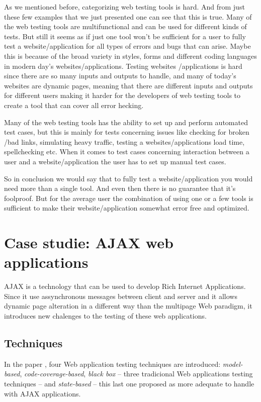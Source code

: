 \documentclass[a4paper, twocolumn]{ieee}
\begin{document}
 
As we mentioned before, categorizing web testing tools is hard. And from just these few examples that we just presented 
one can see that this is true. Many of the web testing tools are multifunctional and can be used for different kinds of 
tests. But still it seems as if just one tool won’t be sufficient for a user to fully test a website/application for all 
types of errors and bugs that can arise. Maybe this is because of the broad variety in styles, forms and different coding 
languages in modern day’s websites/applications.  Testing websites /applications is hard since there are so many inputs 
and outputs to handle, and many of today’s websites are dynamic pages, meaning that there are different inputs and outputs 
for different users making it harder for the developers of web testing tools to create a tool that can cover all error hecking.
  
Many of the web testing tools has the ability to set up and perform automated test cases, but this is mainly for tests 
concerning issues like checking for broken /bad links, simulating heavy traffic, testing a websites/applications load 
time, spellchecking etc. When it comes to test cases concerning interaction between a user and a website/application 
the user has to set up manual test cases.   
 
So in conclusion we would say that to fully test a website/application you would need more than a single tool. And even then 
there is no guarantee that it’s foolproof.  But for the average user the combination of using one or a few tools is 
sufficient to make their website/application somewhat error free and optimized.



\section{Case studie: AJAX web applications \cite{mtr08}}

AJAX is a technology that can be used to develop Rich Internet Applications.
Since it use assynchronous messages between client and server and it allows dynamic page alteration in a different way than the multipage Web paradigm, it introduces new chalenges to the testing of these web applications.

\subsection{Techniques}
In the paper \cite{mtr08}, four Web application testing techniques are introduced: \emph{model-based}, \emph{code-coverage-based}, \emph{black box} -- three tradicional Web applications testing techniques -- and \emph{state-based} -- this last one proposed as more adequate to handle with AJAX applications.
\end{document}
